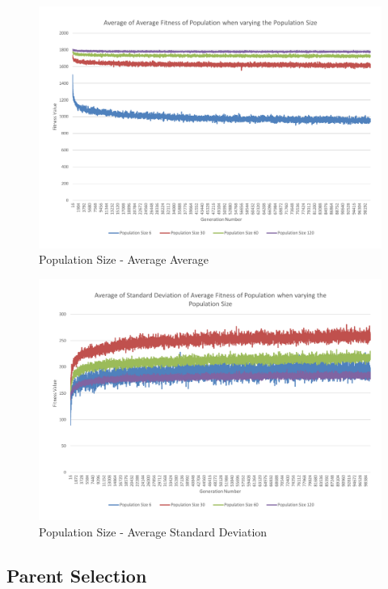 \begin{figure}[thbp]
	\centerline{\includegraphics[width=\paperwidth]{figures/CircleTests/PopulationSize/CircleTestsPopulationAverageAverage.pdf}}
	\caption{Population Size - Average Average}
\end{figure}

\begin{figure}[thbp]
	\centerline{\includegraphics[width=\paperwidth]{figures/CircleTests/PopulationSize/CircleTestsPopulationAverageStandardDeviation.pdf}}
	\caption{Population Size - Average Standard Deviation}
\end{figure}

\clearpage

\subsection{Parent Selection} %
\label{sub:parent_selection}

